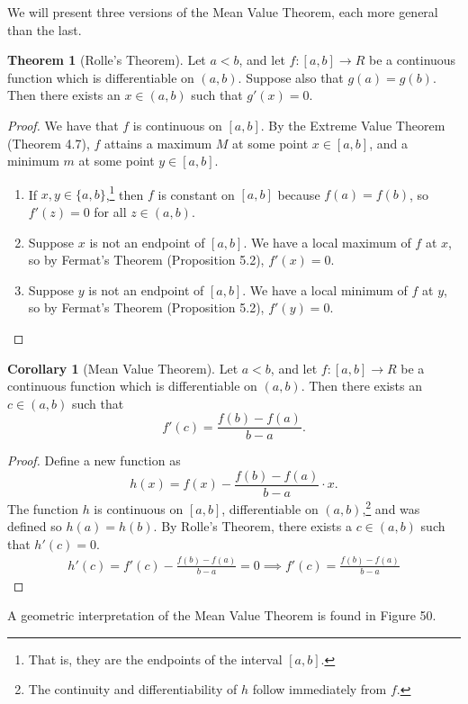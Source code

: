 \documentclass{article}
\theoremstyle{definition}
\newtheorem{theorem}{Theorem}[section]
\newtheorem{corollary}{Corollary}[section]
\begin{document}
	We will present three versions of the Mean Value Theorem, each more general than the last. 
	\begin{theorem}[Rolle's Theorem]
		Let $ a<b $, and let $ f:[a,b]\to R $ be a continuous function which is differentiable on $ (a,b) $. Suppose also that $ g(a)=g(b) $. Then there exists an $ x\in(a,b) $ such that $ g'(x)=0 $.
	\end{theorem}
	\begin{proof}
		We have that $ f $ is continuous on $ [a,b] $. By the Extreme Value Theorem (Theorem 4.7), $ f  $ attains a maximum $ M $ at some point $ x\in[a,b] $, and a minimum $ m $ at some point $ y\in[a,b] $.  
		\begin{enumerate}
			\item [Case 1.]	If $ x,y\in\{a,b\} $,\footnote{That is, they are the endpoints of the interval $ [a,b] $.} then $ f $ is constant on $ [a,b] $ because $ f(a)=f(b) $, so $ f'(z)=0 $ for all $ z\in(a,b)$.   
			\item [Case 2.] Suppose $ x $ is not an endpoint of $ [a,b] $. We have a local maximum of $ f $ at $ x $, so by Fermat's Theorem (Proposition 5.2), $ f'(x)=0 $.
			\item [Case 3.] Suppose $ y $ is not an endpoint of $ [a,b] $. We have a local minimum of $ f $ at $ y $, so by Fermat's Theorem (Proposition 5.2), $ f'(y)=0 $.
		\end{enumerate}
	\end{proof}
	\begin{corollary}[Mean Value Theorem] Let $ a<b $, and let $ f:[a,b]\to R $ be a continuous function which is differentiable on $ (a,b) $. Then there exists an $ c\in(a,b) $ such that $$ f'(c)=\frac{f(b)-f(a)}{b-a}.$$
	\end{corollary}
	\begin{proof}
		Define a new function as $$h(x)=f(x)-\frac{f(b)-f(a)}{b-a}\cdot x .$$ The function $ h $ is continuous on $ [a,b] $, differentiable on $ (a,b) $,\footnote{The continuity and differentiability of $ h $ follow immediately from $ f $.} and was defined so $ h(a)=h(b) $. By Rolle's Theorem, there exists a $ c\in(a,b) $ such that $ h'(c)=0 $. 
		\begin{align*}
			h'(c)=f'(c)-\frac{f(b)-f(a)}{b-a}=0\implies f'(c)=\frac{f(b)-f(a)}{b-a}
		\end{align*}
	\end{proof}
	A geometric interpretation of the Mean Value Theorem is found in Figure 50.
\end{document}
